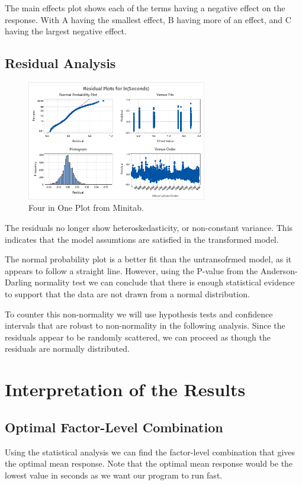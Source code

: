 \documentclass{article}
\begin{document}
The main effects plot shows each of the terms having a negative effect on the response.
With A having the smallest effect, B having more of an effect, and C having the largest negative effect.
\clearpage
\subsection{Residual Analysis}
  \begin{figure}[h] %
    \centering
    \includegraphics[width=0.7\textwidth]{./images/transformed/four_in_one.png}
    \caption{Four in One Plot from Minitab.}
    \label{fig:interaction}
  \end{figure}
  The residuals no longer show heteroskedasticity, or non-constant variance.
  This indicates that the model assumtions are satisfied in the transformed model. 

  The normal probability plot is a better fit than the untransofrmed model, as it appears to follow a straight line.
  However, using the P-value from the Anderson-Darling normality test we can conclude that there is enough statistical evidence to support that the data are not drawn from a normal distribution. 

  To counter this non-normality we will use hypothesis tests and confidence intervals that are robust to non-normality in the following analysis.
  Since the residuals appear to be randomly scattered, we can proceed as though the residuals are normally distributed.

\clearpage
\section{Interpretation of the Results}
\subsection{Optimal Factor-Level Combination}
Using the statistical analysis we can find the factor-level combination that gives the optimal mean response.
Note that the optimal mean response would be the lowest value in seconds as we want our program to run fast.
\end{document}
